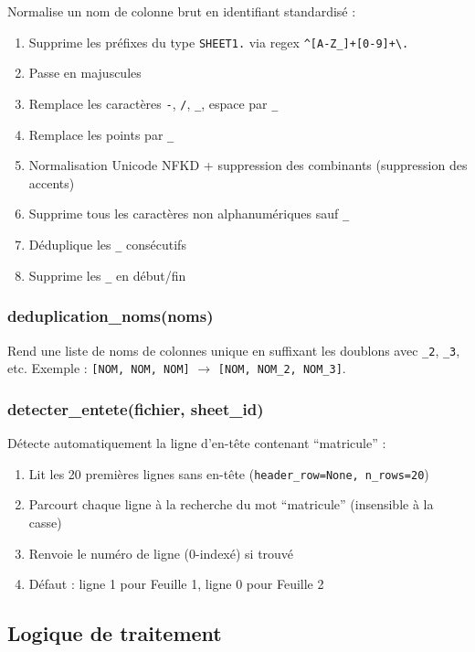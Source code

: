 \documentclass[12pt,a4paper,french]{report}
\begin{document}
Normalise un nom de colonne brut en identifiant standardisé :
\begin{enumerate}[nosep]
  \item Supprime les préfixes du type \texttt{SHEET1.} via regex
        \texttt{\^{}[A-Z\_]+[0-9]+\textbackslash.}
  \item Passe en majuscules
  \item Remplace les caractères \texttt{-}, \texttt{/}, \texttt{\_},
        espace par \texttt{\_}
  \item Remplace les points par \texttt{\_}
  \item Normalisation Unicode NFKD + suppression des combinants
        (suppression des accents)
  \item Supprime tous les caractères non alphanumériques sauf \texttt{\_}
  \item Déduplique les \texttt{\_} consécutifs
  \item Supprime les \texttt{\_} en début/fin
\end{enumerate}

\subsubsection{deduplication\_noms(noms)}

Rend une liste de noms de colonnes unique en suffixant les doublons avec
\texttt{\_2}, \texttt{\_3}, etc. Exemple :
\texttt{[NOM, NOM, NOM]} $\rightarrow$ \texttt{[NOM, NOM\_2, NOM\_3]}.

\subsubsection{detecter\_entete(fichier, sheet\_id)}

Détecte automatiquement la ligne d'en-tête contenant ``matricule'' :
\begin{enumerate}[nosep]
  \item Lit les 20 premières lignes sans en-tête
        (\texttt{header\_row=None, n\_rows=20})
  \item Parcourt chaque ligne à la recherche du mot ``matricule''
        (insensible à la casse)
  \item Renvoie le numéro de ligne (0-indexé) si trouvé
  \item Défaut : ligne 1 pour Feuille 1, ligne 0 pour Feuille 2
\end{enumerate}

\subsection{Logique de traitement}
\end{document}
